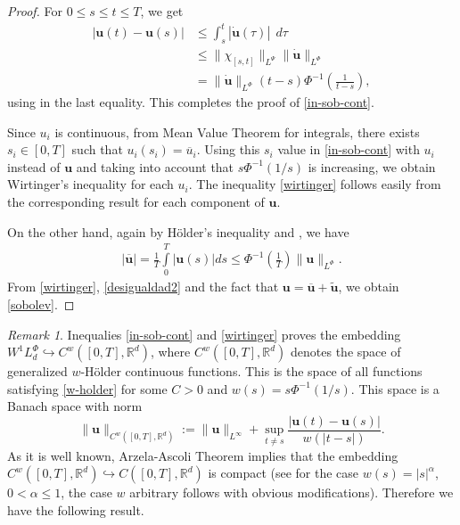 \documentclass[twoside]{article}
\theoremstyle{remark}
\newtheorem{comentario}{Remark}
\newcommand{\orlnor}{\|_{L^{\Phi}}}
\newcommand{\lphi}{L^{\Phi}}
\newcommand{\lpsi}{L^{\Psi}}
\newcommand{\wphi}{W^{1}\lphi}
\renewcommand{\b}[1]{\boldsymbol{#1}}
\newcommand{\rr}{\mathbb{R}}
\renewcommand{\leq}{\leqslant}
\begin{document}
\begin{proof}
For $0 \leq
s\leq t \leq T $, we get
\begin{equation}\label{equicont}
\begin{split}
\left|\b{u}(t)-\b{u}(s) \right| &\leq \int_{s}^t \left| \b{\dot{u}}(\tau)\right|\ \ d\tau\\
&\leq \| \chi_{[s,t]}\|_{\lpsi}\|\b{\dot{u}}\|_{\lphi}\\
&= \|\b{\dot{u}}\|_{\lphi} ( t-s)\Phi^{-1}\left(\frac{1}{t-s}\right),
\end{split}
\end{equation}
using \cite[Eq. (9.11)]{KR} in the last equality. This completes the proof of \eqref{in-sob-cont}.

Since $u_i$ is continuous, from Mean Value Theorem for integrals, 
there exists  $s_i\in [0,T]$ such that $u_i(s_i)=\overline{u}_i$.
Using this $s_i$ value in \eqref{in-sob-cont} with $u_i$ instead of $\b{u}$ and taking into account that $s\Phi^{-1}(1/s)$ is increasing, 
we obtain  Wirtinger's inequality for each $u_i$. The inequality \eqref{wirtinger} 
follows easily from the corresponding result for each component of $\b{u}$.

On the other hand, again by H\"older's inequality and \cite[Eq. (9.11)]{KR}, we have
\begin{equation}\label{desigualdad2}\begin{split}
|\overline{\b{u}}|= \frac{1}{T}\int\limits_{0}^{T}|\b{u}(s)|ds\leq \Phi^{-1}\left(\frac{1}{T}\right)\|\b{u}\orlnor.
\end{split}
\end{equation}
From \eqref{wirtinger}, \eqref{desigualdad2} and the fact that $\b{u}=\overline{\b{u}}+\widetilde{\b{u}}$,  we obtain \eqref{sobolev}.
\end{proof}

\begin{comentario}Inequalies \eqref{in-sob-cont} and \eqref{wirtinger}  proves  the embedding  $\wphi_d\hookrightarrow C^w([0,T],\rr^d)$, where $C^w([0,T],\rr^d)$ denotes the space of generalized $w$-H\"older continuous functions. This is the space of all functions satisfying \eqref{w-holder} for some $C>0$ and $w(s)=s\Phi^{-1}(1/s)$. This space is a Banach space with norm
\[\|\b{u}\|_{  C^w([0,T],\rr^d) }  :=\|\b{u}\|_{L^{\infty}}+\sup\limits_{t\neq s}\frac{|\b{u}(t)-\b{u}(s)|}{w(|t-s|)}.\]
As it is well known, Arzela-Ascoli Theorem implies that  the embedding $C^w([0,T],\rr^d)\hookrightarrow C([0,T],\rr^d)$ is compact (see \cite[Ch. 5]{driver} for the case $w(s)=|s|^{\alpha}$, $0< \alpha\leq 1$, the case  $w$ arbitrary follows with obvious modifications). Therefore we have the following result.
\end{comentario}
\end{document}
